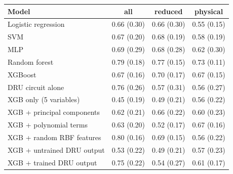 \begin{tabular}{lccc}
\toprule
Model & all & reduced & physical \\
\midrule
Logistic regression & 0.66 (0.30) & 0.66 (0.30) & 0.55 (0.15) \\
SVM & 0.67 (0.20) & 0.68 (0.19) & 0.58 (0.19) \\
MLP & 0.69 (0.29) & 0.68 (0.28) & 0.62 (0.30) \\
Random forest & 0.79 (0.18) & 0.77 (0.15) & 0.73 (0.11) \\
XGBoost & 0.67 (0.16) & 0.70 (0.17) & 0.67 (0.15) \\
DRU circuit alone & 0.76 (0.26) & 0.57 (0.31) & 0.56 (0.27) \\
XGB only (5 variables) & 0.45 (0.19) & 0.49 (0.21) & 0.56 (0.22) \\
XGB + principal components & 0.62 (0.21) & 0.66 (0.22) & 0.60 (0.23) \\
XGB + polynomial terms & 0.63 (0.20) & 0.52 (0.17) & 0.67 (0.16) \\
XGB + random RBF features & 0.80 (0.16) & 0.69 (0.15) & 0.56 (0.22) \\
XGB + untrained DRU output & 0.53 (0.22) & 0.49 (0.21) & 0.57 (0.23) \\
XGB + trained DRU output & 0.75 (0.22) & 0.54 (0.27) & 0.61 (0.17) \\
\bottomrule
\end{tabular}
